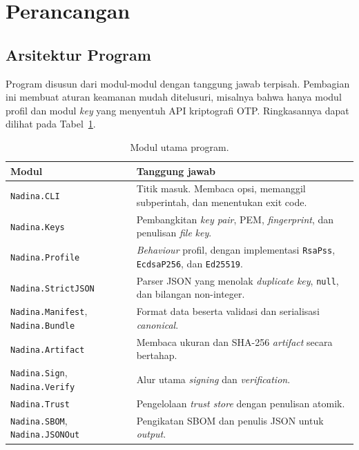 \section{Perancangan}


\subsection{Arsitektur Program}
Program disusun dari modul-modul dengan tanggung jawab terpisah. Pembagian ini membuat aturan
keamanan mudah ditelusuri, misalnya bahwa hanya modul profil dan modul \textit{key} yang menyentuh API
kriptografi OTP. Ringkasannya dapat dilihat pada Tabel~\ref{tab:modul}.

\begin{table}[H]
\centering
\begin{tabular}{@{}p{4.6cm}p{10cm}@{}}
\toprule
Modul & Tanggung jawab \\
\midrule
\texttt{Nadina.CLI} & Titik masuk. Membaca opsi, memanggil subperintah, dan menentukan exit code. \\
\texttt{Nadina.Keys} & Pembangkitan \textit{key pair}, PEM, \textit{fingerprint}, dan penulisan \textit{file} \textit{key}. \\
\texttt{Nadina.Profile} & \textit{Behaviour} profil, dengan implementasi \texttt{RsaPss}, \texttt{EcdsaP256}, dan \texttt{Ed25519}. \\
\texttt{Nadina.StrictJSON} & Parser JSON yang menolak \textit{duplicate key}, \texttt{null}, dan bilangan non-integer. \\
\texttt{Nadina.Manifest}, \texttt{Nadina.Bundle} & Format data beserta validasi dan serialisasi \textit{canonical}. \\
\texttt{Nadina.Artifact} & Membaca ukuran dan SHA-256 \textit{artifact} secara bertahap. \\
\texttt{Nadina.Sign}, \texttt{Nadina.Verify} & Alur utama \textit{signing} dan \textit{verification}. \\
\texttt{Nadina.Trust} & Pengelolaan \textit{trust store} dengan penulisan atomik. \\
\texttt{Nadina.SBOM}, \texttt{Nadina.JSONOut} & Pengikatan SBOM dan penulis JSON untuk \textit{output}. \\
\bottomrule
\end{tabular}
\caption{Modul utama program.}
\label{tab:modul}
\end{table}


